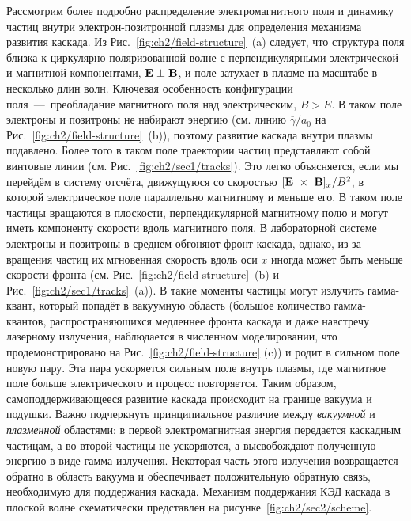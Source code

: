 Рассмотрим более подробно распределение электромагнитного поля и динамику частиц внутри электрон-позитронной плазмы для определения механизма развития каскада. 
Из Рис.~\ref{fig:ch2/field-structure}~(a) следует, что структура поля близка к циркулярно-поляризованной волне с перпендикулярными электрической и магнитной компонентами, $\vb{E \perp B}$, и поле затухает в плазме на масштабе в несколько длин волн. 
Ключевая особенность конфигурации поля~---~преобладание магнитного поля над электрическим, $B > E$.
В таком поле электроны и позитроны не набирают энергию (см. линию $\overline{\gamma} / a_0$ на  Рис.~\ref{fig:ch2/field-structure}~(b)), поэтому развитие каскада внутри плазмы подавлено.
Более того в таком поле траектории частиц представляют собой винтовые линии (см. Рис.~\ref{fig:ch2/sec1/tracks}). 
Это легко объясняется, если мы перейдём в систему отсчёта, движущуюся со скоростью $[\vb{E}~\times~\vb{B}]_x / B^2$, в которой электрическое поле параллельно магнитному и меньше его. 
В таком поле частицы вращаются в плоскости, перпендикулярной магнитному полю и могут иметь компоненту скорости вдоль магнитного поля. 
В лабораторной системе электроны и позитроны в среднем обгоняют фронт каскада, однако, из-за вращения частиц их мгновенная скорость вдоль оси $x$ иногда может быть меньше скорости фронта (см.  Рис.~\ref{fig:ch2/field-structure}~(b) и Рис.~\ref{fig:ch2/sec1/tracks}~(a)). 
В такие моменты частицы могут излучить гамма-квант, который попадёт в вакуумную область (большое количество гамма-квантов, распространяющихся медленнее фронта каскада и даже навстречу лазерному излучения, наблюдается в численном моделировании, что продемонстрировано на Рис.~\ref{fig:ch2/field-structure} (c)) и родит в сильном поле новую пару. 
Эта пара ускоряется сильным поле внутрь плазмы, где магнитное поле больше электрического и процесс повторяется.
Таким образом, самоподдерживающееся развитие каскада происходит на границе вакуума и подушки.
Важно подчеркнуть принципиальное различие между \textit{вакуумной} и \textit{плазменной} областями: в первой электромагнитная энергия передается каскадным частицам, а во второй частицы не ускоряются, а высвобождают полученную энергию в виде гамма-излучения.
Некоторая часть этого излучения возвращается обратно в область вакуума и обеспечивает положительную обратную связь, необходимую для поддержания каскада.
Механизм поддержания КЭД каскада в плоской волне схематически представлен на рисунке~\ref{fig:ch2/sec2/scheme}.



